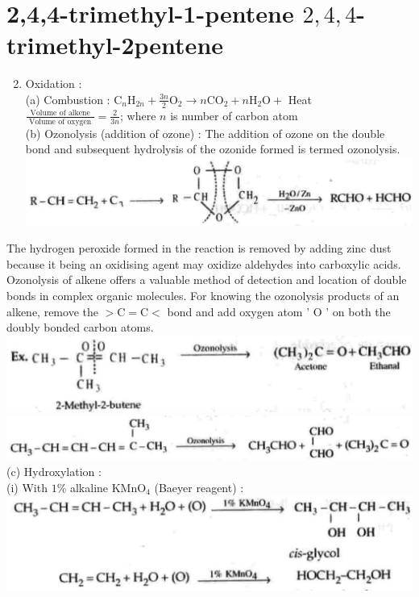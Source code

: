 \documentclass[10pt]{article}
\begin{document}
\section*{2,4,4-trimethyl-1-pentene $2,4,4$-trimethyl-2pentene}
\begin{enumerate}
  \setcounter{enumi}{1}
  \item Oxidation :\\
(a) Combustion : $\mathrm{C}_{n} \mathrm{H}_{2 n}+\frac{3 n}{2} \mathrm{O}_{2} \longrightarrow n \mathrm{CO}_{2}+n \mathrm{H}_{2} \mathrm{O}+$ Heat\\
$\frac{\text { Volume of alkene }}{\text { Volume of oxygen }}=\frac{2}{3 n}$; where $n$ is number of carbon atom\\
(b) Ozonolysis (addition of ozone) : The addition of ozone on the double bond and subsequent hydrolysis of the ozonide formed is termed ozonolysis.\\
\includegraphics[max width=\textwidth, center]{2025_01_28_8470952b98110cec3aabg-183(3)}
\end{enumerate}

The hydrogen peroxide formed in the reaction is removed by adding zinc dust because it being an oxidising agent may oxidize aldehydes into carboxylic acids. Ozonolysis of alkene offers a valuable method of detection and location of double bonds in complex organic molecules. For knowing the ozonolysis products of an alkene, remove the $>\mathrm{C}=\mathrm{C}<$ bond and add oxygen atom ' O ' on both the doubly bonded carbon atoms.\\
\includegraphics[max width=\textwidth, center]{2025_01_28_8470952b98110cec3aabg-183(2)}\\
\includegraphics[max width=\textwidth, center]{2025_01_28_8470952b98110cec3aabg-183}\\
(c) Hydroxylation :\\
(i) With $1 \%$ alkaline $\mathrm{KMnO}_{4}$ (Baeyer reagent) :\\
\includegraphics[max width=\textwidth, center]{2025_01_28_8470952b98110cec3aabg-183(5)}
\end{document}
